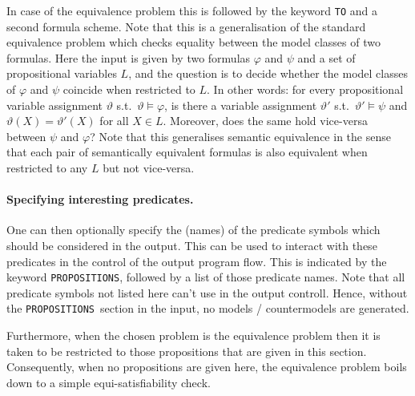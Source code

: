 \documentclass[twoside]{article}
\begin{document}
In case of the equivalence problem this is followed by the keyword \texttt{TO} and a second formula scheme. Note that this is a generalisation
of the standard equivalence problem which checks equality between the model classes of two formulas. Here the input is given by two formulas
$\varphi$ and $\psi$ and a set of propositional variables $L$, and the question is to decide whether the model classes of $\varphi$ and $\psi$
coincide when restricted to $L$. In other words: for every propositional variable assignment $\vartheta$ s.t.\ $\vartheta \models \varphi$, is
there a variable assignment $\vartheta'$ s.t.\ $\vartheta' \models \psi$ and $\vartheta(X) = \vartheta'(X)$ for all $X \in L$. Moreover, does
the same hold vice-versa between $\psi$ and $\varphi$? Note that this generalises semantic equivalence in the sense that each pair of
semantically equivalent formulas is also equivalent when restricted to any $L$ but not vice-versa.
 

\paragraph*{Specifying interesting predicates.}
One can then optionally specify the (names) of the predicate symbols which should be considered in the output. This can be used to interact with these predicates in the control of the output program flow. 
This is indicated by the keyword \texttt{PROPOSITIONS}, followed by a list of those predicate names. Note
that all predicate symbols not listed here can't use in the output controll. Hence, without the \texttt{PROPOSITIONS} section in the input, no models / 
countermodels are generated.

Furthermore, when the chosen problem is the equivalence problem then it is taken to be restricted to those propositions that are given 
in this section. Consequently, when no propositions are given here, the equivalence problem boils down to a simple equi-satisfiability check.
\end{document}
